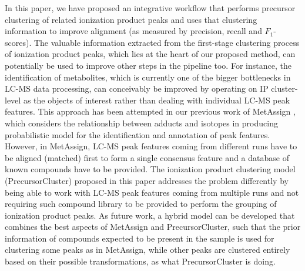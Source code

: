 In this paper, we have proposed an integrative workflow that performs precursor clustering of related ionization product peaks and uses that clustering information to improve alignment (as measured by precision, recall and $F_1$-scores). The valuable information extracted from the first-stage clustering process of ionization product peaks, which lies at the heart of our proposed method, can potentially be used to improve other steps in the pipeline too. For instance, the identification of metabolites, which is currently one of the bigger bottlenecks in LC-MS data processing, can conceivably be improved by operating on IP cluster-level as the objects of interest rather than dealing with individual LC-MS peak features. This approach has been attempted in our previous work of MetAssign \cite{Daly2014}, which considers the relationship between adducts and isotopes in producing probabilistic model for the identification and annotation of peak features. However, in MetAssign, LC-MS peak features coming from different runs have to be aligned (matched) first to form a single consensus feature and a database of known compounds have to be provided. The ionization product clustering model (PrecursorCluster) proposed in this paper addresses the problem differently by being able to work with LC-MS peak features coming from multiple runs and not requiring such compound library to be provided to perform the grouping of ionization product peaks. As future work, a hybrid model can be developed that combines the best aspects of MetAssign and PrecursorCluster, such that the prior information of compounds expected to be present in the sample is used for clustering some peaks as in MetAssign, while other peaks are clustered entirely based on their possible transformations, as what PrecursorCluster is doing. 

